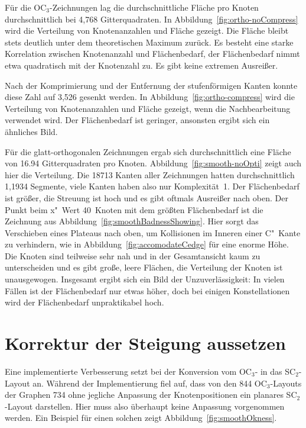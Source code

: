 \documentclass[a4paper]{scrreprt}
\theoremstyle{definition}
\begin{document}
Für die OC$_3$-Zeichnungen lag die durchschnittliche Fläche pro Knoten durchschnittlich bei 4,768 Gitterquadraten. In Abbildung~\ref{fig:ortho-noCompress} wird die Verteilung von Knotenanzahlen und Fläche gezeigt. Die Fläche bleibt stets deutlich unter dem theoretischen Maximum zurück. Es besteht eine starke Korrelation zwischen Knotenanzahl und Flächenbedarf, der Flächenbedarf nimmt etwa quadratisch mit der Knotenzahl zu. Es gibt keine extremen Ausreißer.

Nach der Komprimierung und der Entfernung der stufenförmigen Kanten konnte diese Zahl auf 3,526 gesenkt werden. In Abbildung~\ref{fig:ortho-compress} wird die Verteilung von Knotenanzahlen und Fläche gezeigt, wenn die Nachbearbeitung verwendet wird. Der Flächenbedarf ist geringer, ansonsten ergibt sich ein ähnliches Bild.

Für die glatt-orthogonalen Zeichnungen ergab sich durchschnittlich eine Fläche von 16.94 Gitterquadraten pro Knoten. Abbildung~\ref{fig:smooth-noOpti} zeigt auch hier die Verteilung. Die 18713 Kanten aller Zeichnungen hatten durchschnittlich 1,1934 Segmente, viele Kanten haben also nur Komplexität~1. Der Flächenbedarf ist größer, die Streuung ist hoch und es gibt oftmals Ausreißer nach oben. Der Punkt beim x"~Wert 40~Knoten mit dem größten Flächenbedarf ist die Zeichnung aus Abbildung~\ref{fig:smoothBadnessShowing}. Hier sorgt das Verschieben eines Plateaus nach oben, um Kollisionen im Inneren einer C"~Kante zu verhindern, wie in Abbildung~\ref{fig:accomodateCedge} für eine enorme Höhe. Die Knoten sind teilweise sehr nah und in der Gesamtansicht kaum zu unterscheiden und es gibt große, leere Flächen, die Verteilung der Knoten ist unausgewogen. Insgesamt ergibt sich ein Bild der Unzuverlässigkeit: In vielen Fällen ist der Flächenbedarf nur etwas höher, doch bei einigen Konstellationen wird der Flächenbedarf unpraktikabel hoch.

\section{Korrektur der Steigung aussetzen}

Eine implementierte Verbesserung setzt bei der Konversion vom OC$_3$- in das SC$_2$-Layout an. Während der Implementierung fiel auf, dass von den 844 OC$_3$-Layouts der Graphen 734 ohne jegliche Anpassung der Knotenpositionen ein planares SC$_2$-Layout darstellen. Hier muss also überhaupt keine Anpassung vorgenommen werden. Ein Beispiel für einen solchen zeigt Abbildung~\ref{fig:smoothOkness}.
\end{document}
